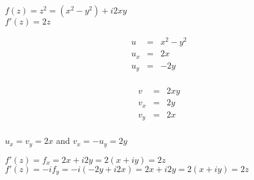 \documentclass[letterpaper,12pt,fleqn]{article}
\begin{document}
\begin{example}
  $f(z)=z^2=(x^2-y^2)+i2xy$ \\
  $f'(z)=2z$ \\
  \begin{minipage}[t]{2in}
    \begin{eqnarray*}
      u &=& x^2-y^2 \\
      u_x &=& 2x \\
      u_y &=& -2y \\
    \end{eqnarray*}
  \end{minipage}
  \begin{minipage}[t]{2in}
    \begin{eqnarray*}
      v &=& 2xy \\
      v_x &=& 2y \\
      v_y &=& 2x \\
    \end{eqnarray*}
  \end{minipage}

  $u_x=v_y=2x$ and $v_x=-u_y=2y$

  $f'(z)=f_x=2x+i2y=2(x+iy)=2z$ \\
  $f'(z)=-if_y=-i(-2y+i2x)=2x+i2y=2(x+iy)=2z$
\end{example}
\end{document}
